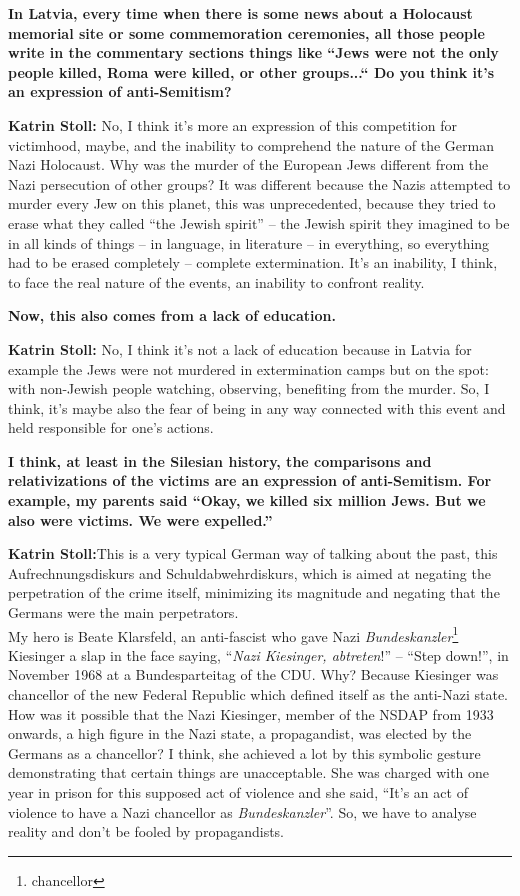\textbf{In Latvia, every time when there is some news about a Holocaust memorial site or some commemoration ceremonies, all those people write in the commentary sections things like “Jews were not the only people killed, Roma were killed, or other groups...“ Do you think it’s an expression of anti-Semitism?} 

\textbf{Katrin Stoll:} No, I think it’s more an expression of this competition for victimhood, maybe, and the inability to comprehend the nature of the German Nazi Holocaust. Why was the murder of the European Jews different from the Nazi persecution of other groups? It was different because the Nazis attempted to murder every Jew on this planet, this was unprecedented, because they tried to erase what they called “the Jewish spirit” – the Jewish spirit they imagined to be in all kinds of things – in language, in literature – in everything, so everything had to be erased completely – complete extermination. It’s an inability, I think, to face the real nature of the events, an inability to confront reality. 

\textbf{Now, this also comes from a lack of education.} 

\textbf{Katrin Stoll:} No, I think it’s not a lack of education because in Latvia for example the Jews were not murdered in extermination camps but on the spot: with non-Jewish people watching, observing, benefiting from the murder. So, I think, it’s maybe also the fear of being in any way connected with this event and held responsible for one’s actions. 

\textbf{I think, at least in the Silesian history, the comparisons and relativizations of the victims are an expression of anti-Semitism. For example, my parents said “Okay, we killed six million Jews. But we also were victims. We were expelled.”}  

\textbf{Katrin Stoll:}This is a very typical German way of talking about the past, this Aufrechnungsdiskurs and Schuldabwehrdiskurs, which is aimed at negating the perpetration of the crime itself, minimizing its magnitude and negating that the Germans were the main perpetrators.\\
My hero is Beate Klarsfeld, an anti-fascist who gave Nazi \textit{Bundeskanzler}\footnote{chancellor} Kiesinger a slap in the face saying, “\textit{Nazi Kiesinger, abtreten}!” – “Step down!”, in November 1968 at a Bundesparteitag of the CDU. Why? Because Kiesinger was chancellor of the new Federal Republic which defined itself as the anti-Nazi state. How was it possible that the Nazi Kiesinger, member of the NSDAP from 1933 onwards, a high figure in the Nazi state, a propagandist, was elected by the Germans as a chancellor?  I think, she achieved a lot by this symbolic gesture demonstrating that certain things are unacceptable. She was charged with one year in prison for this supposed act of violence and she said, “It’s an act of violence to have a Nazi chancellor as \textit{Bundeskanzler}”. So, we have to analyse reality and don’t be fooled by propagandists.  